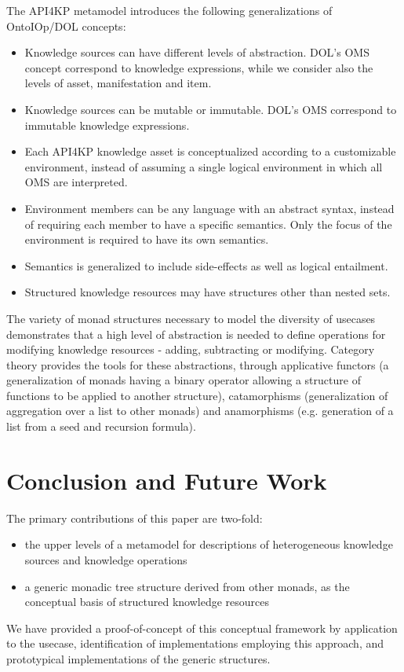 \documentclass[runningheads]{llncs}
\begin{document}

The API4KP metamodel introduces the following generalizations of OntoIOp/DOL concepts:
\begin{itemize}
\item Knowledge sources can have different levels of abstraction. DOL's OMS concept correspond to knowledge expressions, while we consider also the levels of asset, manifestation and item.
\item Knowledge sources can be mutable or immutable. DOL's OMS correspond to immutable knowledge expressions.
\item Each API4KP knowledge asset is conceptualized according to a customizable environment, instead of assuming a single logical environment in which all OMS are interpreted.
\item Environment members can be any language with an abstract syntax, instead of requiring each member to have a specific semantics. Only the focus of the environment is required to have its own semantics.
\item Semantics is generalized to include side-effects as well as logical entailment.
\item Structured knowledge resources may have structures other than nested sets.
\end{itemize}

The variety of monad structures necessary to model the diversity of usecases demonstrates that a high level of abstraction is needed to define operations for modifying knowledge resources - adding, subtracting or modifying. Category theory provides the tools for these abstractions, through applicative functors (a generalization of monads having a binary operator allowing a structure of functions to be applied to another structure), catamorphisms (generalization of aggregation over a list to other monads) and anamorphisms (e.g. generation of a list from a seed and recursion formula).


\section{Conclusion and Future Work}
\label{conc}
The primary contributions of this paper are two-fold:
\begin{itemize}
\item the upper levels of a metamodel for descriptions of heterogeneous knowledge sources and knowledge operations
\item a generic monadic tree structure derived from other monads, as the conceptual basis of structured knowledge resources
\end{itemize}
We have provided a proof-of-concept of this conceptual framework by application to the usecase, identification of implementations employing this approach, and prototypical implementations of the generic structures.
\end{document}
